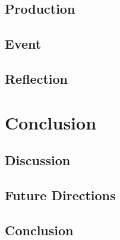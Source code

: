 \documentclass[12pt]{report}
\begin{document}
\section{Production}
\section{Event}
\section{Reflection}

%
\chapter{Conclusion}
\section{Discussion}
\section{Future Directions}
\section{Conclusion}



\nocite{*}						%
\clearpage





%
\end{document}
